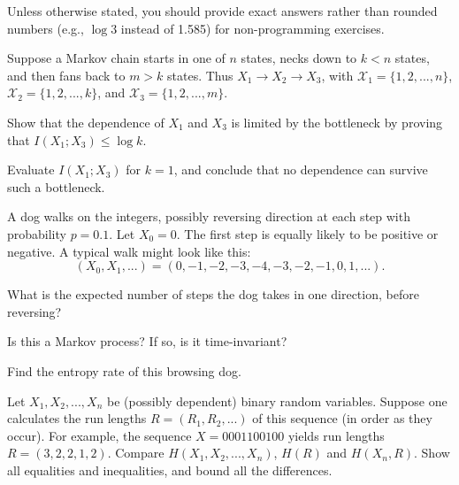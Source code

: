 \documentclass[a4paper,10pt,landscape,twocolumn]{scrartcl}
\begin{document}
\homeworkproblems

{\sffamily\noindent
Unless otherwise stated, you should provide exact answers rather than rounded numbers (e.g., $\log 3$ instead of 1.585) for non-programming exercises.
}

\begin{exercise}[Bottleneck (4pt)]
Suppose a Markov chain starts in one of $n$ states, necks down to $k < n$ states, and then fans back to $m > k$ states. Thus $X_1 \to X_2 \to X_3$, with $\mathcal{X}_1 = \{1, 2, ..., n\}$, $\mathcal{X}_2 = \{1, 2, ..., k\}$, and $\mathcal{X}_3 = \{1, 2, ..., m\}$.
\begin{subex}[(3pt)]
Show that the dependence of $X_1$ and $X_3$ is limited by the bottleneck by proving that $I(X_1;X_3) \leq \log k$.
\end{subex}
\begin{subex}[(1pt)]
Evaluate $I(X_1;X_3)$ for $k = 1$, and conclude that no dependence can survive such a bottleneck.
\end{subex}
\end{exercise}






\begin{exercise}
A dog walks on the integers, possibly reversing direction at each step with probability $p = 0.1$. Let $X_0 = 0$. The first step is equally likely to be positive or negative. A typical walk might look like this:
\[
(X_0, X_1, ...) = (0, -1, -2, -3, -4, -3, -2, -1, 0, 1, ...).
\]
	\begin{subex}[(2pt)]
	What is the expected number of steps the dog takes in one direction, before reversing?
	\end{subex}
	\begin{subex}[(1pt)]
	Is this a Markov process? If so, is it time-invariant?
	\end{subex}
	\begin{subex}[(3pt)]
	Find the entropy rate of this browsing dog.
	\end{subex}
\end{exercise}

\begin{exercise}
Let $X_1, X_2, ..., X_n$ be (possibly dependent) binary random variables.
Suppose one calculates the run lengths $R = (R_1, R_2, ...)$ of this sequence (in order as they occur).
For example, the sequence $X = 0001100100$ yields run lengths $R = (3, 2, 2, 1, 2)$. Compare
$H(X_1, X_2, . . . , X_n)$, $H(R)$ and $H(X_n, R)$. Show all equalities and inequalities, and bound all the
differences.
\end{exercise}
\end{document}
